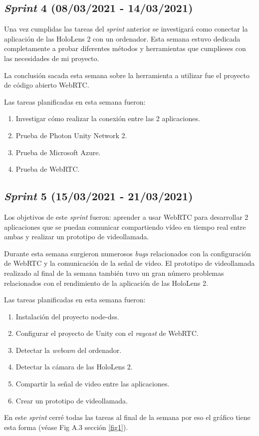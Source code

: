 \subsection{\textit{Sprint} 4 (08/03/2021 - 14/03/2021)}
Una vez cumplidas las tareas del \textit{sprint} anterior se investigará como conectar la aplicación de las HoloLens 2 con un ordenador. Esta semana estuvo dedicada completamente a probar diferentes métodos y herramientas que cumplieses con las necesidades de mi proyecto.

La conclusión sacada esta semana sobre la herramienta a utilizar fue el proyecto de código abierto WebRTC. 

Las tareas planificadas en esta semana fueron:
\begin{enumerate}
    \item Investigar cómo realizar la conexión entre las 2 aplicaciones.
    \item Prueba de Photon Unity Network 2.
    \item Prueba de Microsoft Azure.
    \item Prueba de WebRTC.
\end{enumerate}
\subsection{\textit{Sprint} 5 (15/03/2021 - 21/03/2021)} \label{spint5}
Los objetivos de este \textit{sprint} fueron: aprender a usar WebRTC para desarrollar 2 aplicaciones que se puedan comunicar compartiendo vídeo en tiempo real entre ambas y realizar un prototipo de videollamada.

Durante esta semana surgieron numerosos \textit{bugs} relacionados con la configuración de WebRTC y la comunicación de la señal de video. El prototipo de videollamada realizado al final de la semana también tuvo un gran número problemas relacionados con el rendimiento de la aplicación de las HoloLens 2.

Las tareas planificadas en esta semana fueron:
\begin{enumerate}
    \item Instalación del proyecto node-dss.
    \item Configurar el proyecto de Unity con el \textit{raycast} de WebRTC.
    \item Detectar la \textit{webcam} del ordenador.
    \item Detectar la cámara de las HoloLens 2.
    \item Compartir la señal de video entre las aplicaciones.
    \item Crear un prototipo de videollamada.
\end{enumerate}
En este \textit{sprint} cerré todas las tareas al final de la semana por eso el gráfico tiene esta forma (véase Fig A.3 sección \ref{fig1}).
 \label{fig1}
